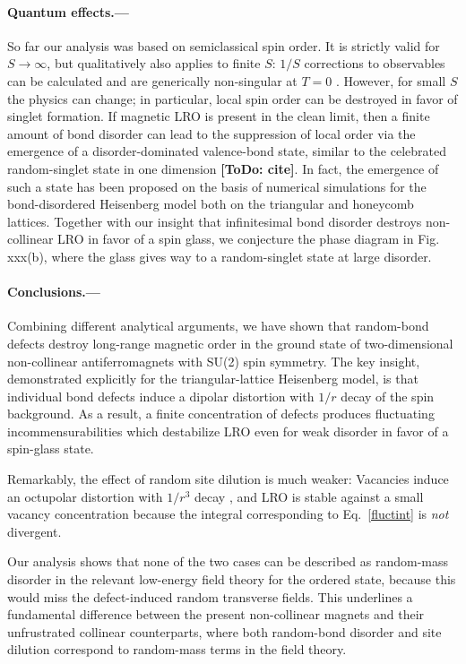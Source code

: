 \documentclass[twocolumn,english,aps,showpacs,prl,floatfix]{revtex4-1}
\newcommand{\todo}[1]{{\color{red} {\bf [ToDo: #1]}}}
\begin{document}
\paragraph{Quantum effects.---}
%
So far our analysis was based on semiclassical spin order. It is strictly valid for $S\to\infty$, but qualitatively also applies to finite $S$: $1/S$ corrections to observables can be calculated and are generically non-singular at $T\!=\!0$ \cite{wollny11,suppl}. However, for small $S$ the physics can change; in particular, local spin order can be destroyed in favor of singlet formation.
%
If magnetic LRO is present in the clean limit, then a finite amount of bond disorder can lead to the suppression of local order via the emergence of a disorder-dominated valence-bond state, similar to the celebrated random-singlet state in one dimension \todo{cite}. In fact, the emergence of such a state has been proposed on the basis of numerical simulations for the bond-disordered Heisenberg model both on the triangular and honeycomb lattices.
%
Together with our insight that infinitesimal bond disorder destroys non-collinear LRO in favor of a spin glass, we conjecture the phase diagram in Fig. xxx(b), where the glass gives way to a random-singlet state at large disorder.


\paragraph{Conclusions.---}
%
Combining different analytical arguments, we have shown that random-bond defects destroy long-range magnetic order in the ground state of two-dimensional non-collinear antiferromagnets with SU(2) spin symmetry. The key insight, demonstrated explicitly for the triangular-lattice Heisenberg model, is that individual bond defects induce a dipolar distortion with $1/r$ decay of the spin background. As a result, a finite concentration of defects produces fluctuating incommensurabilities which destabilize LRO even for weak disorder in favor of a spin-glass state.

Remarkably, the effect of random site dilution is much weaker: Vacancies induce an octupolar distortion with $1/r^3$ decay \cite{wollny11}, and LRO is stable against a small vacancy concentration because the integral corresponding to Eq.~\eqref{fluctint} is {\em not} divergent.

Our analysis shows that none of the two cases can be described as random-mass disorder in the relevant low-energy field theory for the ordered state, because this would miss the defect-induced random transverse fields. This underlines a fundamental difference between the present non-collinear magnets and their unfrustrated collinear counterparts, where both random-bond disorder and site dilution correspond to random-mass terms in the field theory.
\end{document}

